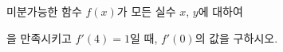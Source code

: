 미분가능한 함수 $f(x)$가 모든 실수 $x$, $y$에 대하여 \par\smallskip{}\par\smallskip\noindent 을 만족시키고 $f'(4)=1$일 때, $f'(0)$의 값을 구하시오.
